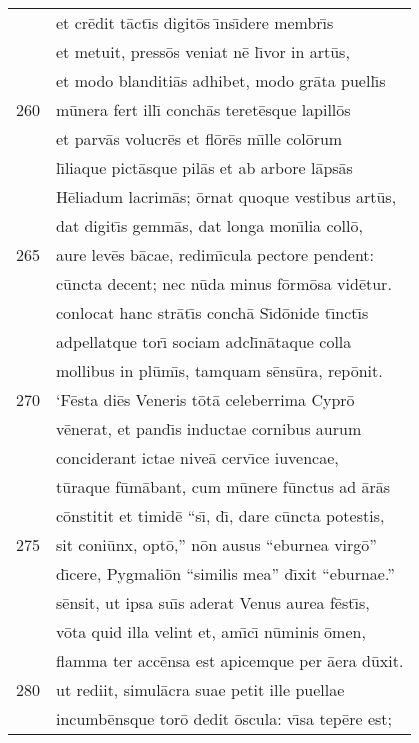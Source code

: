\documentclass[paper=6in:9in,pagesize=pdftex,
               headinclude=on,footinclude=on,12pt]{scrbook}
\begin{document}
\begin{longtable}[p]{ r l }
 & et cr\=edit t\=act\={\i}s digit\=os \={\i}ns\={\i}dere membr\={\i}s\\ 
 & et metuit, press\=os veniat n\=e l\={\i}vor in art\=us,\\ 
 & et modo blanditi\=as adhibet, modo gr\=ata puell\={\i}s\\ 
260 & m\=unera fert ill\={\i} conch\=as teret\=esque lapill\=os\\ 
 & et parv\=as volucr\=es et fl\=or\=es m\={\i}lle col\=orum\\ 
 & l\={\i}liaque pict\=asque pil\=as et ab arbore l\=aps\=as\\ 
 & H\=eliadum lacrim\=as; \=ornat quoque vestibus art\=us,\\ 
 & dat digit\={\i}s gemm\=as, dat longa mon\={\i}lia coll\=o,\\ 
265 & aure lev\=es b\=acae, redim\={\i}cula pectore pendent:\\ 
 & c\=uncta decent; nec n\=uda minus f\=orm\=osa vid\=etur.\\ 
 & conlocat hanc str\=at\={\i}s conch\=a S\={\i}d\=onide t\={\i}nct\={\i}s\\ 
 & adpellatque tor\={\i} sociam adcl\={\i}n\=ataque colla\\ 
 & mollibus in pl\=um\={\i}s, tamquam s\=ens\=ura, rep\=onit.\\ 
270 & \indent `F\=esta di\=es Veneris t\=ot\=a celeberrima Cypr\=o\\ 
 & v\=enerat, et pand\={\i}s inductae cornibus aurum\\ 
 & conciderant ictae nive\=a cerv\={\i}ce iuvencae,\\ 
 & t\=uraque f\=um\=abant, cum m\=unere f\=unctus ad \=ar\=as\\ 
 & c\=onstitit et timid\=e ``s\={\i}, d\={\i}, dare c\=uncta potestis,\\ 
275 & sit coni\=unx, opt\=o,'' n\=on ausus ``eburnea virg\=o''\\ 
 & d\={\i}cere, Pygmali\=on ``similis mea'' d\={\i}xit ``eburnae.''\\ 
 & s\=ensit, ut ipsa su\={\i}s aderat Venus aurea f\=est\={\i}s,\\ 
 & v\=ota quid illa velint et, am\={\i}c\={\i} n\=uminis \=omen,\\ 
 & flamma ter acc\=ensa est apicemque per \=aera d\=uxit.\\ 
280 & ut rediit, simul\=acra suae petit ille puellae\\ 
 & incumb\=ensque tor\=o dedit \=oscula: v\={\i}sa tep\=ere est;\\ 

\end{longtable}
\end{document}
